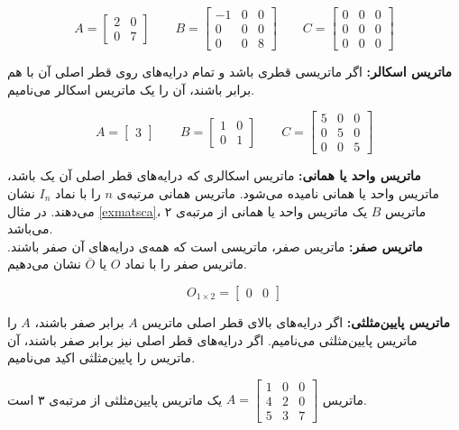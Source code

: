 \begin{example}
	\[
	A = \begin{bmatrix}
		2 & 0 \\
		0 & 7
	\end{bmatrix}
	\qquad
	B = \begin{bmatrix}
		-1 & 0 & 0 \\
		0 & 0 & 0 \\
		0 & 0 & 8
	\end{bmatrix}
	\qquad
	C = \begin{bmatrix}
		0 & 0 & 0 \\
		0 & 0 & 0 \\
		0 & 0 & 0
	\end{bmatrix}
	\]
\end{example}
\smallskip
\textbf{ماتریس اسکالر:}
اگر ماتریسی قطری باشد و تمام درایه‌های روی قطر اصلی آن با هم برابر باشند، آن را یک ماتریس اسکالر می‌نامیم.
\begin{example} \label{exmatsca}
	\[
	A = \begin{bmatrix}
		3
	\end{bmatrix}
	\qquad
	B = \begin{bmatrix}
		1 & 0 \\
		0 & 1
	\end{bmatrix}
	\qquad
	C = \begin{bmatrix}
		5 & 0 & 0 \\
		0 & 5 & 0 \\
		0 & 0 & 5
	\end{bmatrix}
	\]
\end{example}
\smallskip
\textbf{ماتریس واحد یا همانی:}
ماتریس اسکالری که درایه‌های قطر اصلی آن یک باشد، ماتریس واحد یا همانی نامیده می‌شود. ماتریس همانی مرتبه‌ی $n$ را با نماد
$I_n$
نشان می‌دهند. در مثال
\ref{exmatsca}،
ماتریس $B$ یک ماتریس واحد یا همانی از مرتبه‌ی ۲ می‌باشد.
\\
\textbf{ماتریس صفر:}
ماتریس صفر، ماتریسی است که همه‌ی درایه‌های آن صفر باشند. ماتریس صفر را با نماد
$O$
یا
$\overline{O}$
نشان می‌دهیم.
\begin{example}
	$$O_{1 \times 2} =
	\begin{bmatrix}
		0 & 0
	\end{bmatrix}$$
\end{example}
\smallskip
\textbf{ماتریس پایین‌مثلثی:}
اگر درایه‌های بالای قطر اصلی ماتریس $A$ برابر صفر باشند، $A$ را ماتریس پایین‌مثلثی می‌نامیم. اگر درایه‌های قطر اصلی نیز برابر صفر باشند، آن ماتریس را پایین‌مثلثی اکید می‌نامیم.
\begin{example}
	ماتریس
	$
	A = \begin{bmatrix}
		1 & 0 & 0 \\
		4 & 2 & 0 \\
		5 & 3 & 7
	\end{bmatrix}
	$
	یک ماتریس پایین‌مثلثی از مرتبه‌ی ۳ است.
\end{example}
